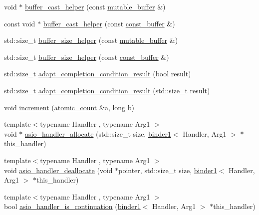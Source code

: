 \begin{DoxyCompactItemize}
\item 
void $\ast$ \hyperlink{namespaceasio_1_1detail_a56299c41d22abc2d7b3e9cf8cf4f5d4f}{buffer\+\_\+cast\+\_\+helper} (const \hyperlink{classasio_1_1mutable__buffer}{mutable\+\_\+buffer} \&)
\item 
const void $\ast$ \hyperlink{namespaceasio_1_1detail_adcf786bea6ae5f1f5ffb488e680ee939}{buffer\+\_\+cast\+\_\+helper} (const \hyperlink{classasio_1_1const__buffer}{const\+\_\+buffer} \&)
\item 
std\+::size\+\_\+t \hyperlink{namespaceasio_1_1detail_a24b0aff2084e22a749e2d9f2970638a5}{buffer\+\_\+size\+\_\+helper} (const \hyperlink{classasio_1_1mutable__buffer}{mutable\+\_\+buffer} \&)
\item 
std\+::size\+\_\+t \hyperlink{namespaceasio_1_1detail_adad463129e33e96acfc9b11d53d3290a}{buffer\+\_\+size\+\_\+helper} (const \hyperlink{classasio_1_1const__buffer}{const\+\_\+buffer} \&)
\item 
std\+::size\+\_\+t \hyperlink{namespaceasio_1_1detail_a93ff6b9a1910306cd4a1058fe61e0480}{adapt\+\_\+completion\+\_\+condition\+\_\+result} (bool result)
\item 
std\+::size\+\_\+t \hyperlink{namespaceasio_1_1detail_aff7419349099c20bccd55c3ff9483296}{adapt\+\_\+completion\+\_\+condition\+\_\+result} (std\+::size\+\_\+t result)
\item 
void \hyperlink{namespaceasio_1_1detail_a51583d42ca11cd14f12eb93792b3ed11}{increment} (\hyperlink{namespaceasio_1_1detail_a75f94bf579dec2f59a0c4af6c4c3606e}{atomic\+\_\+count} \&a, long \hyperlink{group__async__read_ga945a5c18fa77a9e2eba420f8f44b2a4f}{b})
\item 
{\footnotesize template$<$typename Handler , typename Arg1 $>$ }\\void $\ast$ \hyperlink{namespaceasio_1_1detail_a81c6573002802f3813040d35b2cba67a}{asio\+\_\+handler\+\_\+allocate} (std\+::size\+\_\+t size, \hyperlink{classasio_1_1detail_1_1binder1}{binder1}$<$ Handler, Arg1 $>$ $\ast$this\+\_\+handler)
\item 
{\footnotesize template$<$typename Handler , typename Arg1 $>$ }\\void \hyperlink{namespaceasio_1_1detail_a0179ce7d547b8cddf9f75fd26dc3feca}{asio\+\_\+handler\+\_\+deallocate} (void $\ast$pointer, std\+::size\+\_\+t size, \hyperlink{classasio_1_1detail_1_1binder1}{binder1}$<$ Handler, Arg1 $>$ $\ast$this\+\_\+handler)
\item 
{\footnotesize template$<$typename Handler , typename Arg1 $>$ }\\bool \hyperlink{namespaceasio_1_1detail_a8536e0c400be71db0845fe0e4e03660f}{asio\+\_\+handler\+\_\+is\+\_\+continuation} (\hyperlink{classasio_1_1detail_1_1binder1}{binder1}$<$ Handler, Arg1 $>$ $\ast$this\+\_\+handler)

\end{DoxyCompactItemize}
